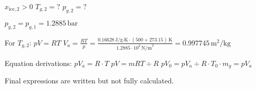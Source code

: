 \( x_{\text{ice},2} > 0 \)  
\( T_{g,2} = ? \)  
\( p_{g,2} = ? \)  

\( p_{g,2} = p_{g,1} = 1.2885 \, \text{bar} \)  

For \( T_{g,2} \):  
\( pV = RT \)  
\( V_a = \frac{RT}{p} = \frac{0.16628 \, \text{J/g·K} \cdot (500 + 273.15) \, \text{K}}{1.2885 \cdot 10^2 \, \text{N/m}^2} = 0.997745 \, \text{m}^2/\text{kg} \)  

Equation derivations:  
\( pV_a = R \cdot T \)  
\( pV = mRT \div R \)  
\( pV_0 = pV_a \div R \cdot T_0 \cdot m_{g} = pV_a \)  

Final expressions are written but not fully calculated.